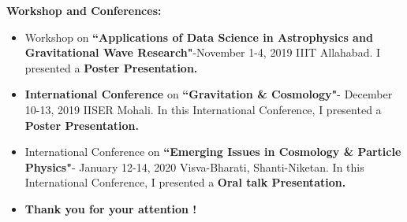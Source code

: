 \documentclass[10pt,xcolor={dvipsnames}]{beamer}
\begin{document}
{\1
\begin{frame}
 
 {\color{blue}\Large \textbf{Workshop and Conferences:}}
 
\vspace{3mm}
  \begin{itemize}
 \item[\ding{74}]
Workshop on \textbf{``Applications of Data Science in Astrophysics and Gravitational Wave Research"}-November 1-4, 2019 IIIT Allahabad. I presented a \textbf{Poster Presentation.}
\vspace{3mm}\\
\item[\ding{74}]
{\textbf{International Conference}} on \textbf{``Gravitation \& Cosmology"}- December 10-13, 2019 IISER Mohali. In this International Conference, I presented a \textbf{Poster Presentation.}
\vspace{3mm}\\
\item[\ding{74}]
International Conference on \textbf{``Emerging Issues in Cosmology \& Particle Physics"}- January 12-14, 2020 Visva-Bharati, Shanti-Niketan. In this International Conference, I presented a \textbf{Oral talk Presentation.}
\vspace{8mm}\\
\item[]
\begin{center}
\textbf{Thank you for your attention !}
\end{center}
\end{itemize}
\end{frame}}
\end{document}
